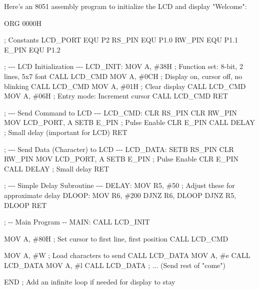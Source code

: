 \documentclass[
]{article}
\newenvironment{Shaded}{}{}
\newcommand{\NormalTok}[1]{#1}
\begin{document}
Here's an 8051 assembly program to initialize the LCD and display
"Welcome":

\begin{Shaded}
\begin{Highlighting}[]
\NormalTok{ORG 0000H}

\NormalTok{; Constants}
\NormalTok{LCD\_PORT EQU P2}
\NormalTok{RS\_PIN   EQU P1.0}
\NormalTok{RW\_PIN   EQU P1.1}
\NormalTok{E\_PIN    EQU P1.2}

\NormalTok{; {-}{-}{-} LCD Initialization {-}{-}{-}}
\NormalTok{LCD\_INIT:}
\NormalTok{    MOV A, \#38H  ; Function set: 8{-}bit, 2 lines, 5x7 font}
\NormalTok{    CALL LCD\_CMD}
\NormalTok{    MOV A, \#0CH  ; Display on, cursor off, no blinking}
\NormalTok{    CALL LCD\_CMD}
\NormalTok{    MOV A, \#01H  ; Clear display}
\NormalTok{    CALL LCD\_CMD}
\NormalTok{    MOV A, \#06H  ; Entry mode: Increment cursor}
\NormalTok{    CALL LCD\_CMD}
\NormalTok{    RET}

\NormalTok{; {-}{-}{-} Send Command to LCD  {-}{-}{-}}
\NormalTok{LCD\_CMD:}
\NormalTok{    CLR RS\_PIN}
\NormalTok{    CLR RW\_PIN}
\NormalTok{    MOV LCD\_PORT, A}
\NormalTok{    SETB E\_PIN     ; Pulse Enable}
\NormalTok{    CLR E\_PIN}
\NormalTok{    CALL DELAY     ; Small delay (important for LCD)}
\NormalTok{    RET}

\NormalTok{; {-}{-}{-} Send Data (Character) to LCD {-}{-}{-}}
\NormalTok{LCD\_DATA:}
\NormalTok{    SETB RS\_PIN}
\NormalTok{    CLR RW\_PIN}
\NormalTok{    MOV LCD\_PORT, A}
\NormalTok{    SETB E\_PIN      ; Pulse Enable}
\NormalTok{    CLR E\_PIN}
\NormalTok{    CALL DELAY      ; Small delay}
\NormalTok{    RET}

\NormalTok{; {-}{-}{-} Simple Delay Subroutine {-}{-}{-}}
\NormalTok{DELAY:}
\NormalTok{    MOV R5, \#50    ; Adjust these for approximate delay}
\NormalTok{    DLOOP: MOV R6, \#200}
\NormalTok{           DJNZ R6, DLOOP}
\NormalTok{           DJNZ R5, DLOOP}
\NormalTok{           RET}

\NormalTok{; {-}{-} Main Program {-}{-}}
\NormalTok{MAIN:}
\NormalTok{    CALL LCD\_INIT}

\NormalTok{    MOV A, \#80H     ; Set cursor to first line, first position}
\NormalTok{    CALL LCD\_CMD}

\NormalTok{    MOV A, \#\textquotesingle{}W\textquotesingle{}    ; Load characters to send}
\NormalTok{    CALL LCD\_DATA}
\NormalTok{    MOV A, \#\textquotesingle{}e\textquotesingle{}}
\NormalTok{    CALL LCD\_DATA}
\NormalTok{    MOV A, \#\textquotesingle{}l\textquotesingle{}}
\NormalTok{    CALL LCD\_DATA}
\NormalTok{    ; ... (Send rest of "come")}

\NormalTok{END ; Add an infinite loop if needed for display to stay}
\end{Highlighting}
\end{Shaded}
\end{document}
